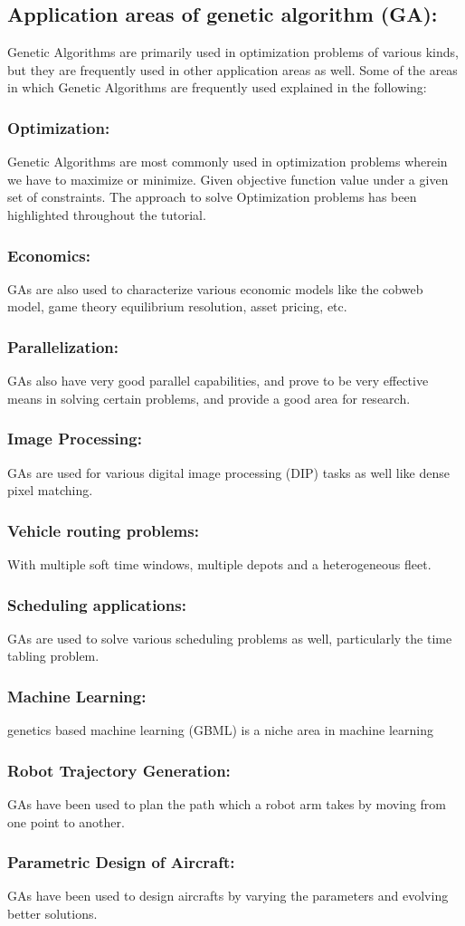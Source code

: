\subsection{Application areas of genetic algorithm (GA):}
Genetic Algorithms are primarily used in optimization problems of
various kinds, but they are frequently used in other application areas as
well. Some of the areas in which Genetic Algorithms are frequently used
explained in the following:
\subsubsection{Optimization:}
Genetic Algorithms are most commonly used in
optimization problems wherein we have to maximize or minimize.
Given objective function value under a given set of constraints. The
approach to solve Optimization problems has been highlighted
throughout the tutorial. 
\subsubsection{Economics:}
GAs are also used to characterize various economic
models like the cobweb model, game theory equilibrium resolution,
asset pricing, etc.
\subsubsection{Parallelization:}GAs also have very good parallel capabilities, and
prove to be very effective means in solving certain problems, and
provide a good area for research.
\subsubsection{Image Processing:} GAs are used for various digital image processing
(DIP) tasks as well like dense pixel matching.
\subsubsection{Vehicle routing problems:} With multiple soft time windows, multiple
depots and a heterogeneous fleet.
\subsubsection{Scheduling applications:}GAs are used to solve various scheduling
problems as well, particularly the time tabling problem.
\subsubsection{Machine Learning:}genetics based machine learning (GBML) is a
niche area in machine learning
\subsubsection{Robot Trajectory Generation:}GAs have been used to plan the path
which a robot arm takes by moving from one point to another.
\subsubsection{Parametric Design of Aircraft:}GAs have been used to design
aircrafts by varying the parameters and evolving better solutions.
\newpage

